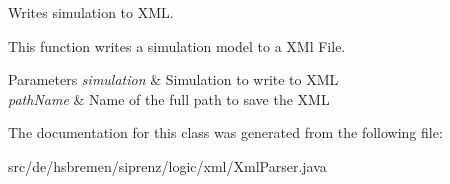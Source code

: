 Writes simulation to X\+ML. 

This function writes a simulation model to a X\+Ml File.


\begin{DoxyParams}{Parameters}
{\em simulation} & Simulation to write to X\+ML \\
\hline
{\em path\+Name} & Name of the full path to save the X\+ML \\
\hline
\end{DoxyParams}


The documentation for this class was generated from the following file\+:\begin{DoxyCompactItemize}
\item 
src/de/hsbremen/siprenz/logic/xml/Xml\+Parser.\+java\end{DoxyCompactItemize}
